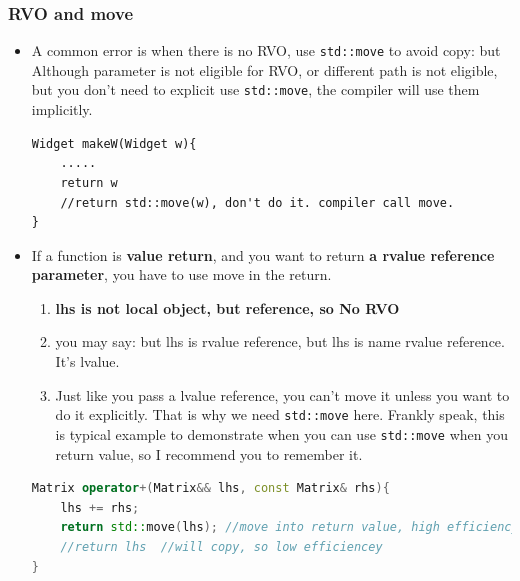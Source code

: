 \documentclass[a4paper,11pt,twoside]{book}
\begin{document}
\subsubsection{RVO and move}
\begin{itemize}
	
	\item A common error is when there is no RVO, use \texttt{std::move} to avoid copy: but Although parameter is not eligible for RVO, or different path is not eligible, but you don't need to explicit use \texttt{std::move}, the compiler will use them implicitly.
	
\begin{lstlisting}
Widget makeW(Widget w){
	.....
	return w
	//return std::move(w), don't do it. compiler call move. 
} 
\end{lstlisting}
	
	\item If a function is \textbf{value return}, and you want to return \textbf{a rvalue reference parameter}, you have to use move in the return.
	\begin{enumerate}
		\item \textbf{lhs is not local object, but reference, so No RVO}
		\item you may say: but lhs is rvalue reference, but lhs is name rvalue reference. It's lvalue.
		
		\item Just like you pass a lvalue reference, you can't move it unless you want to do it explicitly. That is why we need \texttt{std::move} here. Frankly speak, this is typical example to demonstrate when you can use \texttt{std::move} when you return value, so I recommend you to remember it.
	\end{enumerate}

\begin{lstlisting}[frame=single, language=c++]
Matrix operator+(Matrix&& lhs, const Matrix& rhs){
	lhs += rhs; 
	return std::move(lhs); //move into return value, high efficiency. 
	//return lhs  //will copy, so low efficiencey
} 
\end{lstlisting}

\end{itemize}

\end{document}
